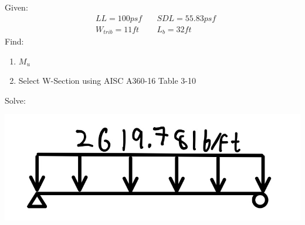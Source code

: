 \documentclass{report} %
\begin{document}
Given:
\begin{equation*}
    \begin{aligned}
        &LL = 100psf &\quad SDL = 55.83psf \\
        &W_{trib} = 11ft &\quad L_b = 32ft 
    \end{aligned}
\end{equation*}
Find: 
\begin{enumerate}
    \item $M_u$
    \item Select W-Section using AISC A360-16 Table 3-10
\end{enumerate}
Solve:
\begin{center}
    \includegraphics[scale=0.15]{RoofBeams_A6_B6_Loads}
\end{center}
\end{document}
